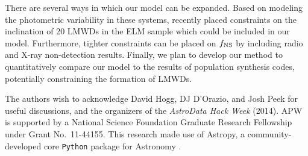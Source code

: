 \documentclass[apjl]{emulateapj}
\begin{document}

There are several ways in which our model can be expanded. Based on modeling the photometric variability in these systems, \citet{hermes14} recently placed constraints on the inclination of 20 LMWDs in the ELM sample which could be included in our model. Furthermore, tighter constraints can be placed on $f_{\rm NS}$ by including radio and X-ray non-detection results. Finally, we plan to develop our method to quantitatively compare our model to the results of population synthesis codes, potentially constraining the formation of LMWDs.



\acknowledgements
The authors wish to acknowledge David Hogg, DJ D'Orazio, and Josh Peek for useful discussions, and the organizers of the \emph{AstroData Hack Week} (2014). 
APW is supported by a National Science Foundation Graduate Research Fellowship under Grant No.\ 11-44155. 
This research made use of Astropy, a community-developed core \texttt{Python} package for Astronomy \citep{astropy13}. \\


\end{document}
